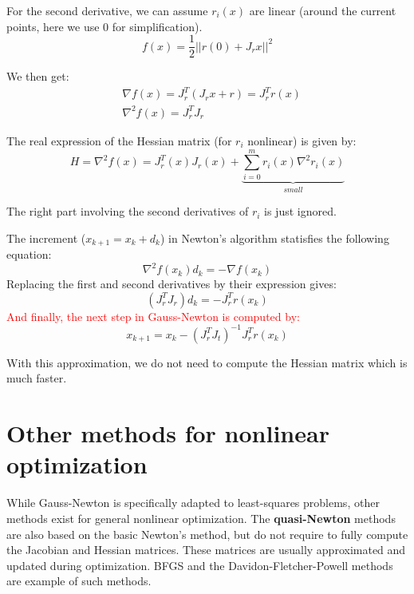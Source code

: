 For the second derivative, we can assume $r_i(x)$ are linear (around the current points, here we use 0 for simplification).
\begin{equation}
    f(x) = \frac{1}{2} ||r(0) + J_rx||^2
\end{equation}

We then get:
\begin{equation}
\begin{split}
    &\nabla f(x) = J_r^T(J_rx+r) = J_r^T r(x) \\
    &\nabla^2 f(x) = J_r^TJ_r
\end{split}
\end{equation}

The real expression of the Hessian matrix (for $r_i$ nonlinear) is given by:
\begin{equation}
    H = \nabla^2 f(x) = J_r^T(x)J_r(x) + \underbrace{\sum_{i=0}^m r_i(x)\nabla^2 r_i(x)}_{small}
\end{equation}

The right part involving the second derivatives of $r_i$ is just ignored.

The increment ($x_{k+1}=x_k+d_k$) in Newton's algorithm statisfies the following equation:
\begin{equation}
    \nabla^2 f(x_k) d_k = -\nabla f(x_k)
\end{equation}
Replacing the first and second derivatives by their expression gives:
\begin{equation}
    (J_r^TJ_r)d_k = -J_r^Tr(x_k)
\end{equation}
\textcolor{red}{And finally, the next step in Gauss-Newton is computed by:}
\begin{equation}
    x_{k+1} = x_k - (J_r^TJ_t)^{-1} J_r^Tr(x_k)
\end{equation}

With this approximation, we do not need to compute the Hessian matrix which is much faster.

\section{Other methods for nonlinear optimization}
While Gauss-Newton is specifically adapted to least-squares problems, other methods exist for general nonlinear optimization.
The \textbf{quasi-Newton} methods are also based on the basic Newton's method, but do not  require to fully compute the Jacobian and Hessian matrices. These matrices are usually approximated and updated during optimization.
BFGS and the Davidon-Fletcher-Powell methods are example of such methods.


